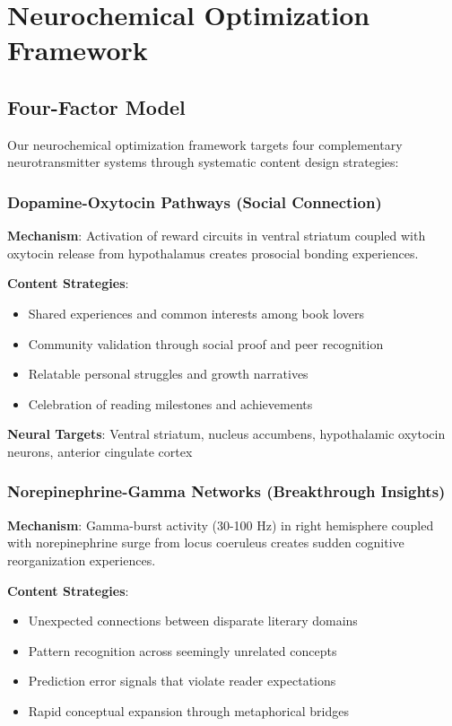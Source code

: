 \documentclass[11pt,letterpaper]{article}
\begin{document}
\section{Neurochemical Optimization Framework}

\subsection{Four-Factor Model}

Our neurochemical optimization framework targets four complementary neurotransmitter systems through systematic content design strategies:

\subsubsection{Dopamine-Oxytocin Pathways (Social Connection)}

\textbf{Mechanism}: Activation of reward circuits in ventral striatum coupled with oxytocin release from hypothalamus creates prosocial bonding experiences.

\textbf{Content Strategies}:
\begin{itemize}
    \item Shared experiences and common interests among book lovers
    \item Community validation through social proof and peer recognition
    \item Relatable personal struggles and growth narratives
    \item Celebration of reading milestones and achievements
\end{itemize}

\textbf{Neural Targets}: Ventral striatum, nucleus accumbens, hypothalamic oxytocin neurons, anterior cingulate cortex

\subsubsection{Norepinephrine-Gamma Networks (Breakthrough Insights)}

\textbf{Mechanism}: Gamma-burst activity (30-100 Hz) in right hemisphere coupled with norepinephrine surge from locus coeruleus creates sudden cognitive reorganization experiences.

\textbf{Content Strategies}:
\begin{itemize}
    \item Unexpected connections between disparate literary domains
    \item Pattern recognition across seemingly unrelated concepts
    \item Prediction error signals that violate reader expectations
    \item Rapid conceptual expansion through metaphorical bridges
\end{itemize}
\end{document}
